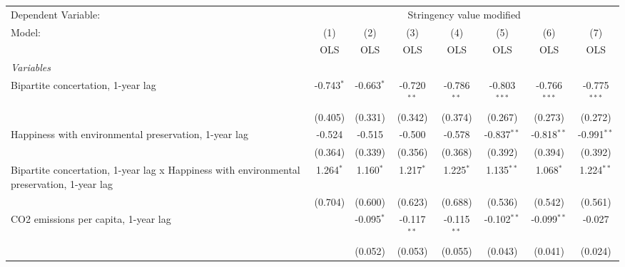 
\begingroup
\centering
\begin{tabular}{lccccccc}
   \toprule
   Dependent Variable: & \multicolumn{7}{c}{Stringency value modified}\\
   Model:                                                                                     & (1)          & (2)          & (3)           & (4)           & (5)            & (6)            & (7)\\  
                                                                                              &  OLS         & OLS          & OLS           & OLS           & OLS            & OLS            & OLS\\  
   \midrule
   \emph{Variables}\\
   Bipartite concertation, 1-year lag                                                         & -0.743$^{*}$ & -0.663$^{*}$ & -0.720$^{**}$ & -0.786$^{**}$ & -0.803$^{***}$ & -0.766$^{***}$ & -0.775$^{***}$\\   
                                                                                              & (0.405)      & (0.331)      & (0.342)       & (0.374)       & (0.267)        & (0.273)        & (0.272)\\   
   Happiness with environmental preservation, 1-year lag                                      & -0.524       & -0.515       & -0.500        & -0.578        & -0.837$^{**}$  & -0.818$^{**}$  & -0.991$^{**}$\\   
                                                                                              & (0.364)      & (0.339)      & (0.356)       & (0.368)       & (0.392)        & (0.394)        & (0.392)\\   
   Bipartite concertation, 1-year lag x Happiness with environmental preservation, 1-year lag & 1.264$^{*}$  & 1.160$^{*}$  & 1.217$^{*}$   & 1.225$^{*}$   & 1.135$^{**}$   & 1.068$^{*}$    & 1.224$^{**}$\\   
                                                                                              & (0.704)      & (0.600)      & (0.623)       & (0.688)       & (0.536)        & (0.542)        & (0.561)\\   
   CO2 emissions per capita, 1-year lag                                                       &              & -0.095$^{*}$ & -0.117$^{**}$ & -0.115$^{**}$ & -0.102$^{**}$  & -0.099$^{**}$  & -0.027\\   
                                                                                              &              & (0.052)      & (0.053)       & (0.055)       & (0.043)        & (0.041)        & (0.024)\\   

\end{tabular}
